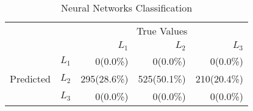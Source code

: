 \begin{table}
\centering
  \caption{Neural Networks Classification}
    \begin{tabular}{rrrrr}
    \toprule
    & &\multicolumn{3}{c}{True Values}\\
    & & ${L_1}$ & ${L_2}$ & ${L_3}$ \\
    \multirow{3}{*}{Predicted} & ${L_1}$ & 0(0.0\%) & 0(0.0\%) & 0(0.0\%) \\
    & ${L_2}$ & 295(28.6\%) & 525(50.1\%) & 210(20.4\%) \\
    & ${L_3}$ & 0(0.0\%) & 0(0.0\%) & 0(0.0\%) \\\bottomrule
  \end{tabular}
\end{table}

